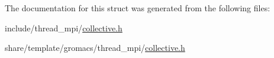 \-The documentation for this struct was generated from the following files\-:\begin{DoxyCompactItemize}
\item 
include/thread\-\_\-mpi/\hyperlink{include_2thread__mpi_2collective_8h}{collective.\-h}\item 
share/template/gromacs/thread\-\_\-mpi/\hyperlink{share_2template_2gromacs_2thread__mpi_2collective_8h}{collective.\-h}\end{DoxyCompactItemize}
